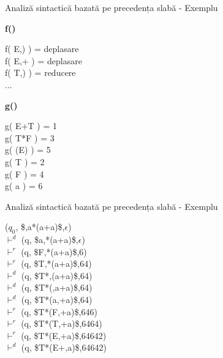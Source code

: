 \documentclass[pdf]{beamer}
\begin{document}
\begin{frame}{Analiză sintactică bazată pe precedența slabă - Exemplu}

\color{red} \textbf {f()}

\color{black}
    f( E,) ) = deplasare \\
    f( E,+ ) = deplasare \\
    f( T,) ) =  reducere \\
	... 
\newline
	
\color{red} \textbf {g()}

\color{black}
    g( E+T ) = 1 \\
    g( T*F ) = 3 \\ 
    g( (E) ) = 5 \\
    g( T ) = 2   \\
    g( F ) = 4   \\
    g( a ) = 6   \\

\end{frame}



\begin{frame}{Analiză sintactică bazată pe precedența slabă - Exemplu}

($q_0$, \$,a*(a+a)\$,$\epsilon$) 
\\ $\vdash^{d}$ (q, \$a,*(a+a)\$,$\epsilon$)
\\ $\vdash^{r}$ (q, \$F,*(a+a)\$,6)
\\ $\vdash^{r}$ (q, \$T,*(a+a)\$,64)
\\ $\vdash^{d}$ (q, \$T*,(a+a)\$,64)
\\ $\vdash^{d}$ (q, \$T*(,a+a)\$,64)
\\ $\vdash^{d}$ (q, \$T*(a,+a)\$,64)
\\ $\vdash^{r}$ (q, \$T*(F,+a)\$,646)
\\ $\vdash^{r}$ (q, \$T*(T,+a)\$,6464)
\\ $\vdash^{r}$ (q, \$T*(E,+a)\$,64642)
\\ $\vdash^{d}$ (q, \$T*(E+,a)\$,64642)

\end{frame}
\end{document}
